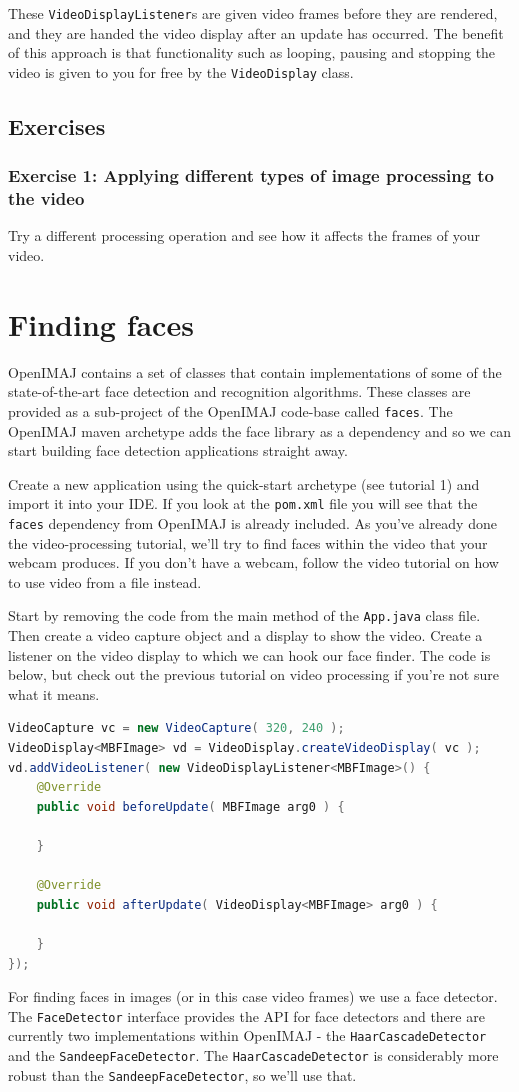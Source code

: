 \documentclass[10pt,a4paper,twoside,extrafontsizes]{memoir}
\begin{document}
These \verb+VideoDisplayListener+s are given video frames before they are rendered, and they are handed the 
video display after an update has occurred. The benefit of this approach is that functionality such as 
looping, pausing and stopping the video is given to you for free by the \verb+VideoDisplay+ class. 

\section*{Exercises}
\subsection*{Exercise 1: Applying different types of image processing to the video}
Try a different processing operation and see how it affects the frames of your video.

\chapter{Finding faces}
OpenIMAJ contains a set of classes that contain implementations of some of the state-of-the-art face 
detection and recognition algorithms. These classes are provided as a sub-project of the OpenIMAJ 
code-base called \verb+faces+. The OpenIMAJ maven archetype adds the face library as a dependency and 
so we can start building face detection applications straight away.

Create a new application using the quick-start archetype (see tutorial 1) and import it into your IDE. 
If you look at the \verb+pom.xml+ file you will see that the \verb+faces+ dependency from OpenIMAJ is 
already included. As you've already done the video-processing tutorial, we'll try to find faces within 
the video that your webcam produces. If you don't have a webcam, follow the video tutorial on how to 
use video from a file instead.

Start by removing the code from the main method of the \verb+App.java+ class file. Then create a video 
capture object and a display to show the video. Create a listener on the video display to which we can 
hook our face finder. The code is below, but check out the previous tutorial on video processing if 
you're not sure what it means.
\begin{lstlisting}[language=java]
VideoCapture vc = new VideoCapture( 320, 240 );
VideoDisplay<MBFImage> vd = VideoDisplay.createVideoDisplay( vc );
vd.addVideoListener( new VideoDisplayListener<MBFImage>() {
    @Override
    public void beforeUpdate( MBFImage arg0 ) {

    }

    @Override
    public void afterUpdate( VideoDisplay<MBFImage> arg0 ) {

    }
});
\end{lstlisting}
For finding faces in images (or in this case video frames) we use a face detector. The \verb+FaceDetector+ 
interface provides the API for face detectors and there are currently two implementations within OpenIMAJ - 
the \verb+HaarCascadeDetector+ and the \verb+SandeepFaceDetector+. The \verb+HaarCascadeDetector+
is considerably more robust than the \verb+SandeepFaceDetector+, so we'll use that.
\end{document}

